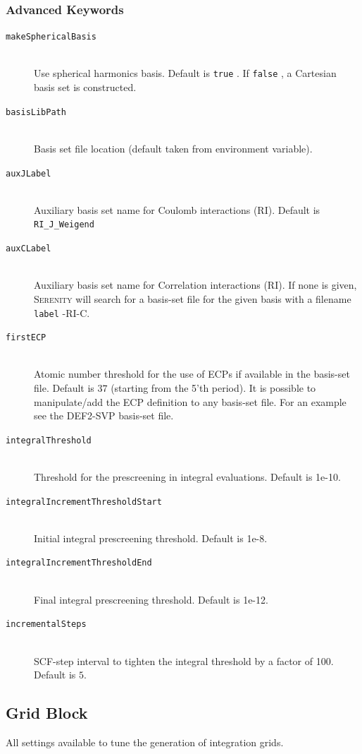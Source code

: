 \documentclass[bibliography=totocnumbered,a4paper,10pt,oneside]{scrbook}
\newcommand{
\serenity}{\textsc{Serenity}\xspace}
\newcommand{\ttt}[1]{%
  \begingroup\setlength{\fboxsep}{1pt}%
  \colorbox{serenity-green!30}{\texttt{\hspace*{2pt}\vphantom{(g}#1\hspace*{2pt}}}%
  \endgroup
}
\begin{document}
\subsubsection{Advanced Keywords}
\begin{description}
    \item [\texttt{makeSphericalBasis}]\hfill \\
    Use spherical harmonics basis. Default is \ttt{true}. If \ttt{false}, a Cartesian basis set is constructed.
    \item [\texttt{basisLibPath}]\hfill \\
    Basis set file location (default taken from environment variable).
    \item [\texttt{auxJLabel}]\hfill \\
    Auxiliary basis set name for Coulomb interactions (RI). Default is \ttt{RI\_J\_Weigend}
    \item [\texttt{auxCLabel}]\hfill \\
    Auxiliary basis set name for Correlation interactions (RI). If none is given, \serenity will search for a
    basis-set file for the given basis with a filename \ttt{label}-RI-C.
    \item [\texttt{firstECP}]\hfill \\
    Atomic number threshold for the use of ECPs if available in the basis-set file. Default is $37$ (starting from the 5'th period).
    It is possible to manipulate/add the ECP definition to any basis-set file. For an example see the DEF2-SVP basis-set file.
    \item [\texttt{integralThreshold}]\hfill \\
    Threshold for the prescreening in integral evaluations. Default is 1e-10.
    \item [\texttt{integralIncrementThresholdStart}]\hfill \\
    Initial integral prescreening threshold. Default is 1e-8.
    \item [\texttt{integralIncrementThresholdEnd}]\hfill \\
    Final integral prescreening threshold. Default is 1e-12.
    \item [\texttt{incrementalSteps}]\hfill \\
    SCF-step interval to tighten the integral threshold by a factor of 100. Default is $5$.
 \end{description}

\subsection{Grid Block}\label{sec:system:grid}
All settings available to tune the generation of integration grids.
\end{document}
